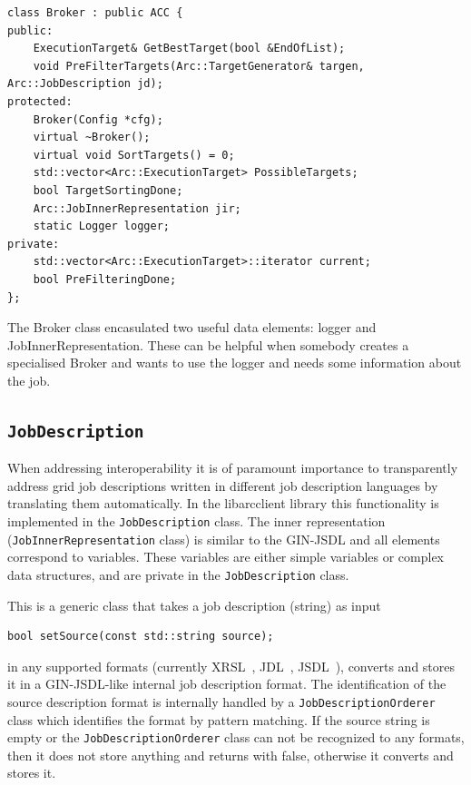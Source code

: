 \documentclass{book}
\newcommand{\arclib}{libarcclient}
\newcommand{\JobDescription}{\texttt{JobDescription}}
\begin{document}
\begin{shaded}
\begin{verbatim}
class Broker : public ACC {
public:
    ExecutionTarget& GetBestTarget(bool &EndOfList);
    void PreFilterTargets(Arc::TargetGenerator& targen, Arc::JobDescription jd);    
protected:
    Broker(Config *cfg);
    virtual ~Broker();
    virtual void SortTargets() = 0;
    std::vector<Arc::ExecutionTarget> PossibleTargets;
    bool TargetSortingDone;
    Arc::JobInnerRepresentation jir;
    static Logger logger;
private:
    std::vector<Arc::ExecutionTarget>::iterator current;
    bool PreFilteringDone;
};
\end{verbatim}
\end{shaded}

The Broker class encasulated two useful data elements: logger and JobInnerRepresentation. These can be helpful when somebody creates a specialised Broker and wants to use the logger and needs some information about the job.


\subsection{{\JobDescription}}

When addressing interoperability it is of paramount importance to
transparently address grid job descriptions written in different job
description languages by translating them automatically. In the
{\arclib} library this functionality is implemented in the
{\JobDescription} class. The inner representation (\texttt{JobInnerRepresentation}
class) is similar to the GIN-JSDL and all elements correspond to
variables. These variables are either simple variables or complex data structures,
and are private in the {\JobDescription} class.


This is a generic class that takes a job
description (string) as input

\begin{shaded}
\begin{verbatim}
bool setSource(const std::string source);
\end{verbatim}
\end{shaded}

in any supported formats (currently XRSL~\cite{xrsl}, JDL~\cite{jdl},
JSDL~\cite{jsdl}), converts and stores it in a GIN-JSDL-like internal job
description format. The identification of the source description
format is internally handled by a \texttt{JobDescriptionOrderer} class
which identifies the format by pattern matching. If the source string is
empty or the \texttt{JobDescriptionOrderer} class can not be recognized
to any formats, then it does not store anything and returns with false, otherwise
it converts and stores it. 
\end{document}
